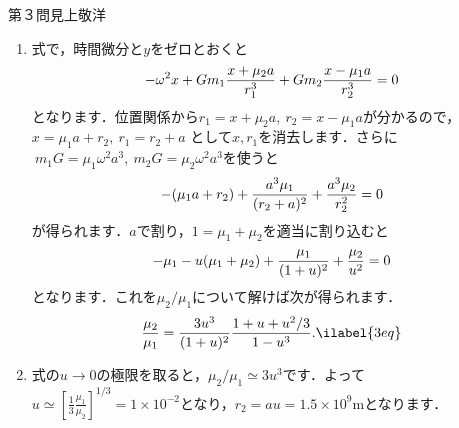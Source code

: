 \begin{answer}{第３問}{見上敬洋}
\begin{enumerate}
\item
  式で，時間微分と$y$をゼロとおくと
  \begin{equation}
  -\omega^2 x + Gm_1 \frac{x+\mu_2a}{r_1^3} + Gm_2 \frac{x-\mu_1a}{r_2^3}  = 0 \notag
  \end{equation}
  となります．位置関係から$r_1 = x + \mu_2 a ,\> r_2 = x - \mu_1a$が分かるので，$x=\mu_1a + r_2, \> r_1 = r_2 + a$ として$x,r_1$を消去します．さらに$\> m_1 G = \mu_1 \omega^2 a^3,\> m_2 G = \mu_2 \omega^2 a^3$を使うと
  \begin{equation}
  -(\mu_1 a + r_2) + \frac{a^3\mu_1}{(r_2+a)^2} + \frac{a^3\mu_2}{r_2^2}  = 0 \notag
  \end{equation}
  が得られます．$a$で割り，$1 = \mu_1+\mu_2 $を適当に割り込むと
  \begin{equation}
  -\mu_1 - u(\mu_1+\mu_2) + \frac{\mu_1}{(1+u)^2}+\frac{\mu_2}{u^2} = 0 \notag
  \end{equation}
  となります．これを$\mu_2/\mu_1$について解けば次が得られます．
  \begin{equation}
  \frac{\mu_2}{\mu_1} = \frac{3u^3}{(1+u)^2} \frac{1+u+u^2/3}{1-u^3}. \ilabel{3eq}
  \end{equation}

\item
  式の$u\to 0$の極限を取ると，$\mu_2/\mu_1 \simeq 3u^3$です．よって
  $\displaystyle u \simeq \left[\frac 13 \frac{\mu_1}{\mu_2} \right]^{1/3} = 1\times 10^{-2}$となり，$r_2 = au = 1.5\times 10^9 \mathrm{m}$となります．
\end{enumerate}
\end{answer}
